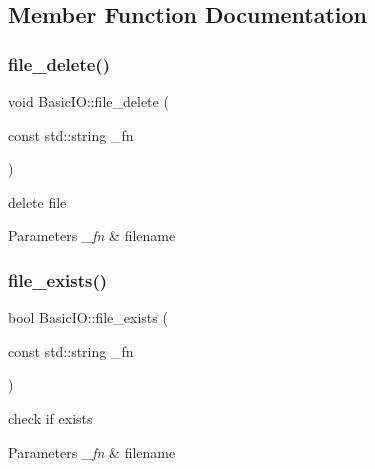 \subsection{Member Function Documentation}
\mbox{\label{class_basic_i_o_ad47c4d4b9845b01ad4ee0e81e726472c}} 
\subsubsection{\texorpdfstring{file\+\_\+delete()}{file\_delete()}}
{\footnotesize\ttfamily void Basic\+I\+O\+::file\+\_\+delete (\begin{DoxyParamCaption}\item[{const std\+::string}]{\+\_\+fn }\end{DoxyParamCaption})\hspace{0.3cm}{\ttfamily [static]}}



delete file 


\begin{DoxyParams}{Parameters}
{\em \+\_\+fn} & filename \\
\hline
\end{DoxyParams}
\mbox{\label{class_basic_i_o_a875c4dd065101a3fe469222699a45708}} 
\subsubsection{\texorpdfstring{file\+\_\+exists()}{file\_exists()}}
{\footnotesize\ttfamily bool Basic\+I\+O\+::file\+\_\+exists (\begin{DoxyParamCaption}\item[{const std\+::string}]{\+\_\+fn }\end{DoxyParamCaption})\hspace{0.3cm}{\ttfamily [static]}}



check if exists 


\begin{DoxyParams}{Parameters}
{\em \+\_\+fn} & filename \\
\hline
\end{DoxyParams}
\mbox{\label{class_basic_i_o_a0a548f83f6d4289239347e8fd2c93a32}} 
